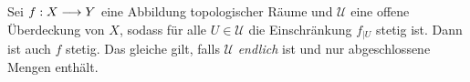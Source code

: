 \begin{lemma} [Verklebung] \label{lemma_pasting}
Sei \(f:X\longrightarrow Y\) eine Abbildung topologischer Räume und \(\mathcal{U}\) eine offene Überdeckung von \(X\), sodass für alle \(U \in \mathcal{U}\) die Einschränkung \(f_{|U}\) stetig ist. Dann ist auch \(f\) stetig. Das gleiche gilt, falls \(\mathcal{U}\) \emph{endlich} ist und nur abgeschlossene Mengen enthält.
\end{lemma}






\pagebreak
\nocite{*}
\printbibliography
